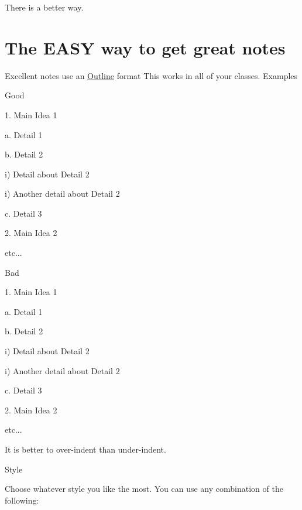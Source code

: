 \documentclass[../../main.tex]{subfiles}
\begin{document}
There is a better way.

\section{The EASY way to get great notes}

\begin{outline}[enumerate]

\1 Excellent notes use an \underline{Outline} format
	\2	
	\2 This works in all of your classes.
\1 Examples
	\begin{boxGreen}{Good}

	1. Main Idea 1

	\quad a. Detail 1

	\quad b. Detail 2


	\quad \quad i) Detail about Detail 2

	\quad \quad i) Another detail about Detail 2

	\quad c. Detail 3

	2. Main Idea 2

	\quad \quad etc...
	\end{boxGreen}

	\begin{boxRed}{Bad}

	1. Main Idea 1

	a. Detail 1

	b. Detail 2

	i) Detail about Detail 2

	i) Another detail about Detail 2

	c. Detail 3

	2. Main Idea 2

	\quad \quad etc...

	\end{boxRed}


	\1 It is better to over-indent than under-indent.

	\1 Style

		\2 Choose whatever style you like the most.  You can use any combination of the following:

	\begin{displayquote}


\end{displayquote}
\end{outline}
\end{document}
